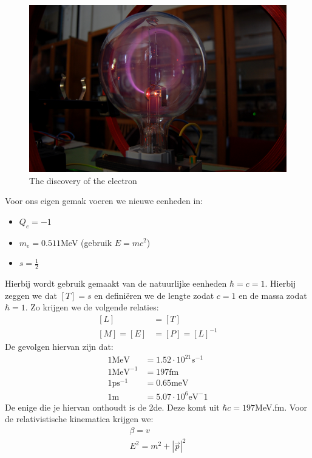 \documentclass[../main.tex]{subfiles}
\begin{document}
\begin{figure}[h]
    \centering
    \includegraphics[width=0.8\linewidth]{introduction_and_review/elec_disc.png}
    \caption{The discovery of the electron}%
    \label{fig:elec_disc}
\end{figure}

Voor ons eigen gemak voeren we nieuwe eenheden in:
\begin{itemize}
    \item $Q_e = -1$
    \item $m_e = 0.511$MeV (gebruik $E=mc^2$)
    \item $s=\frac{1}{2}$
\end{itemize}
Hierbij wordt gebruik gemaakt van de natuurlijke eenheden $\hbar = c = 1$. Hierbij zeggen we dat $[T]=s$ en definiëren we de lengte zodat $c=1$ en de massa zodat $\hbar = 1$. Zo krijgen we de volgende relaties:
\begin{equation}
    \begin{aligned}
        \label{eq:nat_units}
        [L]&=[T]\\
        [M]=[E]&=[P]=[L]^{-1}
    \end{aligned}
\end{equation}
De gevolgen hiervan zijn dat:
\begin{equation}
    \begin{aligned}
        \label{eq:nat_units_gevolgen}
        1 \text{MeV} &= 1.52 \cdot 10^{21} s^{-1}\\
        1 \text{MeV}^{-1} &= 197\text{fm}\\
        1 \text{ps}^{-1} &= 0.65 \text{meV}\\
        1 \text{m} &= 5.07\cdot 10^6 \text{eV}^-1
    \end{aligned}
\end{equation}
De enige die je hiervan onthoudt is de 2de. Deze komt uit $\hbar c = 197$MeV.fm. Voor de relativistische kinematica krijgen we:
\begin{equation}
    \begin{aligned}
        \label{eq:rel_kin}
        \beta = v\\
        E^2 = m^2 + |\vec{p}|^2
    \end{aligned}
\end{equation}
\end{document}
